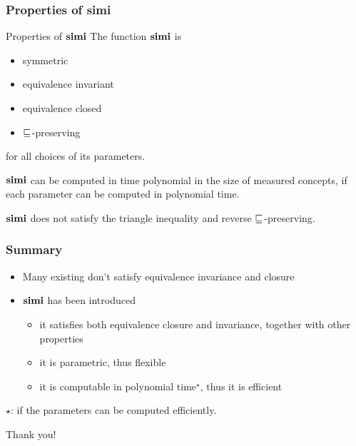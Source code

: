 \documentclass[smaller, dvipsnames]{beamer}
\begin{document}
\begin{frame}
  \frametitle{Properties of simi}
  \begin{alertblock}{Properties of \(\operatorname{\mathbf{simi}}\)}
    The function \(\operatorname{\mathbf{simi}}\) is
    \begin{itemize}
      \item symmetric
      \item equivalence invariant
      \item equivalence closed
      \item \(\sqsubseteq_{\mathcal{}}\)-preserving
    \end{itemize}
    for all choices of its parameters.
  \end{alertblock}
  \pause
  \begin{theorem}
    \(\operatorname{\mathbf{simi}}\) can be computed in time
    polynomial in the size of measured concepts,
    if each parameter can be computed in polynomial time.
  \end{theorem}
  \pause
  \(\operatorname{\mathbf{simi}}\) does not satisfy the triangle inequality and reverse \(\sqsubseteq_{\mathcal{}}\)-preserving.
\end{frame}

\begin{frame}
  \frametitle{Summary}
  \begin{itemize}[<+->]
    \item Many existing \csm don't satisfy equivalence invariance and closure
    \item \(\operatorname{\mathbf{simi}}\) has been introduced
    \begin{itemize}
      \item it satisfies both equivalence closure and invariance, together with other properties
      \item it is \alert{parametric}, thus flexible
      \item it is computable in polynomial time\(^\star\), thus it is \alert{efficient}
    \end{itemize}
  \end{itemize}
  \onslide<+->
  \scriptsize{\(\star\): if the parameters can be computed efficiently.}
\end{frame}

\begin{frame}[standout]
  Thank you!
\end{frame}

\appendix
\end{document}
